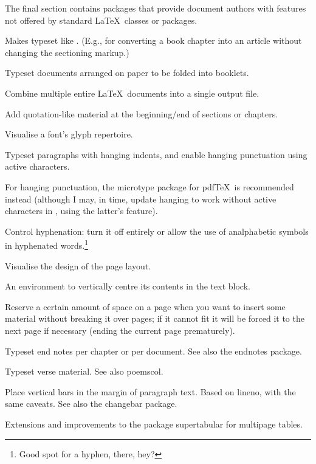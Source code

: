 \documentclass[final]{ltugboat}
\begin{document}
The final section contains packages that provide document authors with features not offered by standard \LaTeX\ classes or packages.

\enlargethispage{-4pc}
\begin{description}[font=\normalfont\sffamily]
\item [anonchap] Makes  typeset like . (E.g., for converting a book chapter into an article without changing the sectioning markup.)

\item [booklet]  Typeset documents arranged on paper to be folded into booklets.
\item [combine]  Combine multiple entire \LaTeX\ documents into a single output file.

\item [epigraph] Add quotation-like material at the beginning\slash{}end of sections or chapters.

\item [fonttable] Visualise a font's glyph repertoire.

\item [hanging]  Typeset paragraphs with hanging indents, and enable hanging punctuation using active characters.

For hanging punctuation, the \textsf{microtype} package for pdf\/\TeX\ is recommended instead (although I may, in time, update \textsf{hanging} to work without active characters in \XeTeX, using the latter's  feature).
\item [hyphenat] Control hyphenation: turn it off entirely or allow the use of analphabetic symbols in hyphenated words.\footnote{Good spot for a hyphen, there, hey?}
\item [layouts] Visualise the design of the page layout.
\item [midpage] An environment to vertically centre its contents in the text block.
\item [needspace] Reserve a certain amount of space on a page when you want to insert some material without breaking it over pages; if it cannot fit it will be forced it to the next page if necessary (ending the current page prematurely).
\item [pagenote] Typeset end notes per chapter or per document. See also the \textsf{endnotes} package.
\item [verse] Typeset verse material. See also \textsf{poemscol}.
\item [vertbars] Place vertical bars in the margin of paragraph text. Based on \textsf{lineno}, with the same caveats. See also the \textsf{changebar} package.
\item [xtab] Extensions and improvements to the package \textsf{supertabular} for multipage tables.
\end{description}
\end{document}
